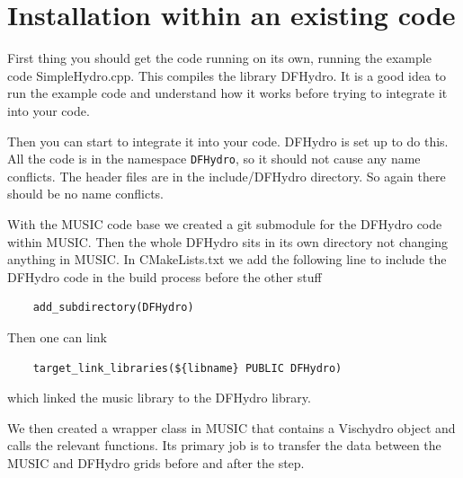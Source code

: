 \documentclass[12pt]{article}
\begin{document}
\section{Installation within an existing code}

First thing you should get the code running on its own, running the example code
SimpleHydro.cpp.  This compiles the library DFHydro.  It is a good idea to run the example code and understand how it works before trying to integrate it into your code.


Then you can start to integrate it into your code.   DFHydro is set up to do
this.  All the code is in the namespace {\tt DFHydro}, so it should not cause
any name conflicts.   The header files are in the include/DFHydro directory. So
again there should be no name conflicts.  

With the MUSIC code base we created a git submodule for the DFHydro code within MUSIC.  Then the whole DFHydro sits in its own directory not changing anything in MUSIC.  
In CMakeLists.txt we add the following line to include
the DFHydro code in the build process  before the other stuff
\begin{verbatim}
    add_subdirectory(DFHydro)
\end{verbatim}
Then one can link 
\begin{verbatim}
    target_link_libraries(${libname} PUBLIC DFHydro)
\end{verbatim}
which linked the music library to the DFHydro library.

We then created a wrapper class in MUSIC that contains a Vischydro object and
calls the relevant functions.  Its primary job is to transfer the data between
the MUSIC and DFHydro grids  before and after the step. 
\end{document}
